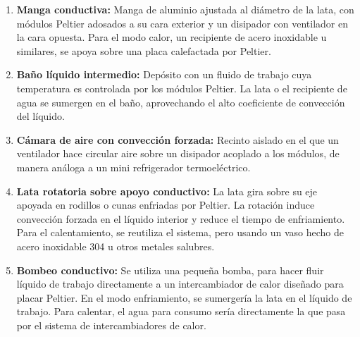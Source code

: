 \documentclass[12pt, a4paper]{article}
\begin{document}
\begin{enumerate}
    \item[\textbf{C1.}] \textbf{Manga conductiva:} Manga de aluminio ajustada al diámetro de la lata, con módulos Peltier adosados a su cara exterior y un disipador con ventilador en la cara opuesta. Para el modo calor, un recipiente de acero inoxidable u similares, se apoya sobre una placa calefactada por Peltier.
    \item[\textbf{C2.}] \textbf{Baño líquido intermedio:} Depósito con un fluido de trabajo cuya temperatura es controlada por los módulos Peltier. La lata o el recipiente de agua se sumergen en el baño, aprovechando el alto coeficiente de convección del líquido.
    \item[\textbf{C3.}] \textbf{Cámara de aire con convección forzada:} Recinto aislado en el que un ventilador hace circular aire sobre un disipador acoplado a los módulos, de manera análoga a un mini refrigerador termoeléctrico.
    \item[\textbf{C4.}] \textbf{Lata rotatoria sobre apoyo conductivo:} La lata gira sobre su eje apoyada en rodillos o cunas enfriadas por Peltier. La rotación induce convección forzada en el líquido interior y reduce el tiempo de enfriamiento. Para el calentamiento, se reutiliza el sistema, pero usando un vaso hecho de acero inoxidable 304 u otros metales salubres.
    \item[\textbf{C5.}] \textbf{Bombeo conductivo:} Se utiliza una pequeña bomba, para hacer fluir líquido de trabajo directamente a un intercambiador de calor diseñado para placar Peltier. En el modo enfriamiento, se sumergería la lata en el líquido de trabajo. Para calentar, el agua para consumo sería directamente la que pasa por el sistema de intercambiadores de calor. 
\end{enumerate}
\end{document}
